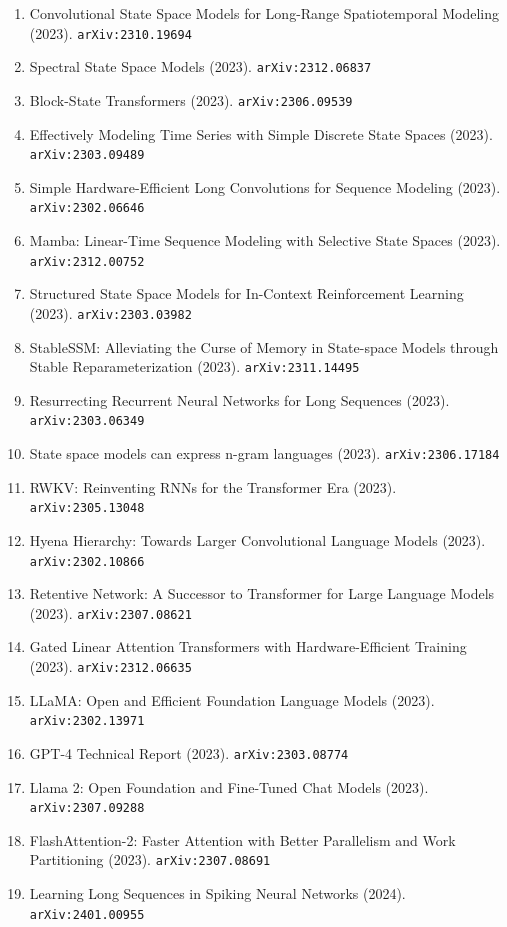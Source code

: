 \documentclass[11pt]{article}
\begin{document}
\begin{enumerate}
  \item Convolutional State Space Models for Long-Range Spatiotemporal Modeling (2023). \texttt{arXiv:2310.19694}
  \item Spectral State Space Models (2023). \texttt{arXiv:2312.06837}
  \item Block-State Transformers (2023). \texttt{arXiv:2306.09539}
  \item Effectively Modeling Time Series with Simple Discrete State Spaces (2023). \texttt{arXiv:2303.09489}
  \item Simple Hardware-Efficient Long Convolutions for Sequence Modeling (2023). \texttt{arXiv:2302.06646}
  \item Mamba: Linear-Time Sequence Modeling with Selective State Spaces (2023). \texttt{arXiv:2312.00752}
  \item Structured State Space Models for In-Context Reinforcement Learning (2023). \texttt{arXiv:2303.03982}
  \item StableSSM: Alleviating the Curse of Memory in State-space Models through
  Stable Reparameterization (2023). \texttt{arXiv:2311.14495}
  \item Resurrecting Recurrent Neural Networks for Long Sequences (2023). \texttt{arXiv:2303.06349}
  \item State space models can express n-gram languages (2023). \texttt{arXiv:2306.17184}
  \item RWKV: Reinventing RNNs for the Transformer Era (2023). \texttt{arXiv:2305.13048}
  \item Hyena Hierarchy: Towards Larger Convolutional Language Models (2023). \texttt{arXiv:2302.10866}
  \item Retentive Network: A Successor to Transformer for Large Language Models (2023). \texttt{arXiv:2307.08621}
  \item Gated Linear Attention Transformers with Hardware-Efficient Training (2023). \texttt{arXiv:2312.06635}
  \item LLaMA: Open and Efficient Foundation Language Models (2023). \texttt{arXiv:2302.13971}
  \item GPT-4 Technical Report (2023). \texttt{arXiv:2303.08774}
  \item Llama 2: Open Foundation and Fine-Tuned Chat Models (2023). \texttt{arXiv:2307.09288}
  \item FlashAttention-2: Faster Attention with Better Parallelism and Work
  Partitioning (2023). \texttt{arXiv:2307.08691}
  \item Learning Long Sequences in Spiking Neural Networks (2024). \texttt{arXiv:2401.00955}

\end{enumerate}
\end{document}
